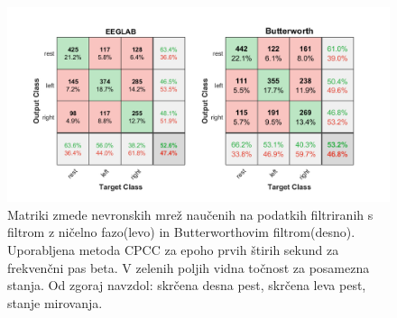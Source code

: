 \begin{figure}
    \begin{center}
    \includegraphics[width=1\linewidth]{slike/ComparisonFilters2.png}
    \end{center}
    \caption{Matriki zmede nevronskih mrež naučenih na podatkih filtriranih s filtrom z ničelno fazo(levo) in Butterworthovim filtrom(desno). Uporabljena metoda CPCC za epoho prvih štirih sekund za frekvenčni pas beta. V zelenih poljih vidna točnost za posamezna stanja. Od zgoraj navzdol: skrčena desna pest, skrčena leva pest, stanje mirovanja. }
    \label{slika:filter_matrika}
    \end{figure}

